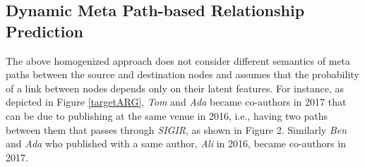 \subsection{Dynamic Meta Path-based Relationship Prediction}

The above homogenized approach does not consider different semantics of meta paths between the source and destination nodes and assumes that the probability of a link between nodes depends only on their latent features. For instance, as depicted in Figure \ref{targetARG}, \textit{Tom} and \textit{Ada} became co-authors in 2017 that can be due to publishing at the same venue in 2016, i.e., having two paths between them that passes through \textit{SIGIR}, as shown in Figure 2. Similarly \textit{Ben} and \textit{Ada} who published with a same author, \textit{Ali} in 2016, became co-authors in 2017. 

